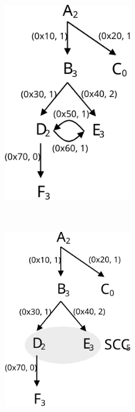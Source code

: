 \begin{figure}[t]
\centering
\begin{subfigure}{0.22\textwidth}
\centering
\includegraphics[width=0.6\textwidth]{fig/cct-1.svg}
\caption{}
\end{subfigure}
~
\begin{subfigure}{0.22\textwidth}
\centering
\includegraphics[width=0.6\textwidth]{fig/cct-2.svg}
\caption{}
\end{subfigure}

\end{figure}
